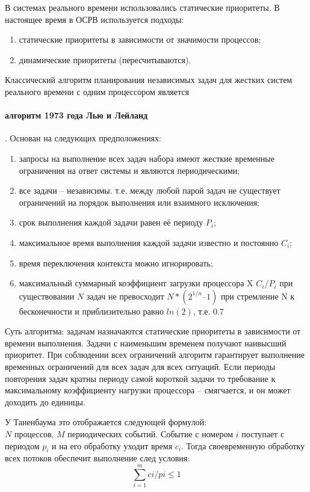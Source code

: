 В системах реального времени использовались статические приоритеты. В настоящее время в ОСРВ используется подходы:
\begin{enumerate}
    \item статические приоритеты в зависимости от значимости процессов;
    \item динамические приоритеты (пересчитываются).
\end{enumerate} 

Классический алгоритм планирования независимых задач для жестких систем реального времени с одним процессором является \paragraph{алгоритм 1973 года Лью и Лейланд}. Основан на следующих предположениях:
\begin{enumerate}
    \item запросы на выполнение всех задач набора имеют жесткие временные ограничения на ответ системы и являются периодическими;
    \item все задачи – независимы. т.е. между любой парой задач не существует ограничений на порядок выполнения или взаимного исключения;
    \item срок выполнения каждой задачи равен её периоду $P_i$;
    \item максимальное время выполнения каждой задачи известно и постоянно $C_i$;
    \item время переключения контекста можно игнорировать;
    \item максимальный суммарный коэффициент загрузки процессора X $C_i/P_i$ при существовании $N$ задач не превосходит $N * (2^{1/n} – 1)$ при стремление N к бесконечности и приблизительно равно $ln(2)$, т.е. 0.7
\end{enumerate} 

Суть алгоритма: задачам назначаются статические приоритеты в зависимости от времени выполнения. Задачи с наименьшим временем получают наивысший приоритет. При соблюдении всех ограничений алгоритм гарантирует выполнение временных ограничений для всех задач для всех ситуаций. Если периоды повторения задач кратны периоду самой короткой задачи то требование к максимальному коэффициенту нагрузки процессора – смягчается, и он может доходить до единицы.

У Таненбаума это отображается следующей формулой:\\
$N$ процессов, $M$ периодических событий. Событие с номером $i$ поступает с периодом $p_i$ и на его обработку уходит время $c_i$. Тогда своевременную обработку всех потоков обеспечит выполнение след условия:
$$\sum_{i=1}^m ci/ pi \leq 1$$